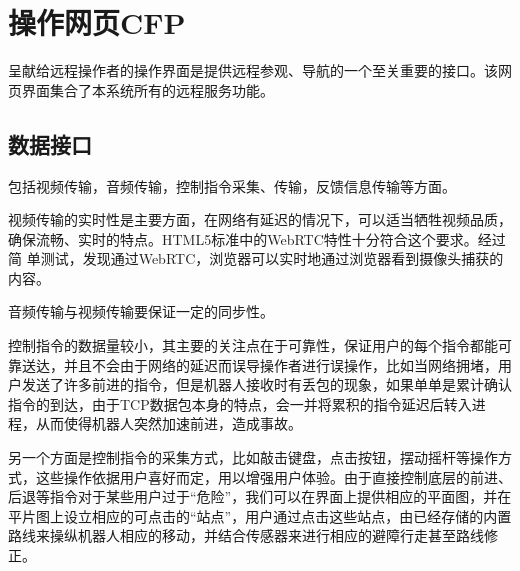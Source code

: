 

\clearpage
\section{操作网页CFP}

呈献给远程操作者的操作界面是提供远程参观、导航的一个至关重要的接口。该网页界面集合了本系统所有的远程服务功能。

\subsection{数据接口}

包括视频传输，音频传输，控制指令采集、传输，反馈信息传输等方面。

视频传输的实时性是主要方面，在网络有延迟的情况下，可以适当牺牲视频品质，
确保流畅、实时的特点。HTML5标准中的WebRTC特性十分符合这个要求。经过简
单测试，发现通过WebRTC，浏览器可以实时地通过浏览器看到摄像头捕获的内容。

音频传输与视频传输要保证一定的同步性。

控制指令的数据量较小，其主要的关注点在于可靠性，保证用户的每个指令都能可靠送达，并且不会由于网络的延迟而误导操作者进行误操作，比如当网络拥堵，用户发送了许多前进的指令，但是机器人接收时有丢包的现象，如果单单是累计确认指令的到达，由于TCP数据包本身的特点，会一并将累积的指令延迟后转入进程，从而使得机器人突然加速前进，造成事故。

另一个方面是控制指令的采集方式，比如敲击键盘，点击按钮，摆动摇杆等操作方式，这些操作依据用户喜好而定，用以增强用户体验。由于直接控制底层的前进、后退等指令对于某些用户过于“危险”，我们可以在界面上提供相应的平面图，并在平片图上设立相应的可点击的“站点”，用户通过点击这些站点，由已经存储的内置路线来操纵机器人相应的移动，并结合传感器来进行相应的避障行走甚至路线修正。

